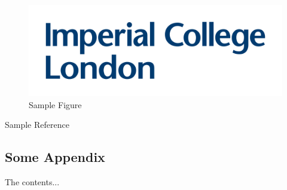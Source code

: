 \documentclass[a4paper]{article}
\begin{document}
\newpage

\printbibliography[
heading=bibintoc,
title={References}
]


\begin{figure}[H]
\centering
\includegraphics[scale=0.18]{logo.png}
\caption{Sample Figure}
\label{fig:image1}
\end{figure}

Sample Reference\cite{einstein}


\begin{appendices}
\chapter{Some Appendix}
The contents...
\end{appendices}
\end{document}
